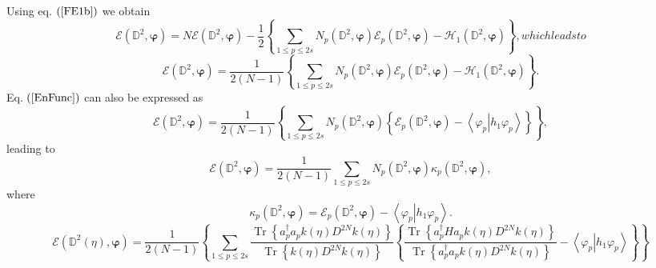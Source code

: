 \documentclass[aps,preprint]{revtex4}%
\begin{document}
Using eq. $\left(  \ref{FE1b}\right)  $ we obtain
\begin{subequations}
\begin{equation}
\mathcal{E}\left(  \mathbb{D}^{2},\mathbf{\varphi}\right)  =N\mathcal{E}%
\left(  \mathbb{D}^{2},\mathbf{\varphi}\right)  -\frac{1}{2}\left\{
\sum_{1\leq p\leq2s}N_{p}\left(  \mathbb{D}^{2},\mathbf{\varphi}\right)
\mathcal{E}_{p}\left(  \mathbb{D}^{2},\mathbf{\varphi}\right)  -\mathcal{H}%
_{1}\left(  \mathbb{D}^{2},\mathbf{\varphi}\right)  \right\}  ,
\end{equation}
which leads to
\end{subequations}
\begin{equation}
\mathcal{E}\left(  \mathbb{D}^{2},\mathbf{\varphi}\right)  =\frac{1}{2\left(
N-1\right)  }\left\{  \sum_{1\leq p\leq2s}N_{p}\left(  \mathbb{D}%
^{2},\mathbf{\varphi}\right)  \mathcal{E}_{p}\left(  \mathbb{D}^{2}%
,\mathbf{\varphi}\right)  -\mathcal{H}_{1}\left(  \mathbb{D}^{2}%
,\mathbf{\varphi}\right)  \right\}  . \label{EnFunc}%
\end{equation}
Eq. $\left(  \ref{EnFunc}\right)  $ can also be expressed as
\begin{equation}
\mathcal{E}\left(  \mathbb{D}^{2},\mathbf{\varphi}\right)  =\frac{1}{2\left(
N-1\right)  }\left\{  \sum_{1\leq p\leq2s}N_{p}\left(  \mathbb{D}%
^{2},\mathbf{\varphi}\right)  \left\{  \mathcal{E}_{p}\left(  \mathbb{D}%
^{2},\mathbf{\varphi}\right)  -\left\langle \left.  \varphi_{p}\right\vert
h_{1}\varphi_{p}\right\rangle \right\}  \right\}  ,
\end{equation}
leading to
\begin{equation}
\mathcal{E}\left(  \mathbb{D}^{2},\mathbf{\varphi}\right)  =\frac{1}{2\left(
N-1\right)  }\sum_{1\leq p\leq2s}N_{p}\left(  \mathbb{D}^{2},\mathbf{\varphi
}\right)  \kappa_{p}\left(  \mathbb{D}^{2},\mathbf{\varphi}\right)  ,
\end{equation}
where
\begin{equation}
\kappa_{p}\left(  \mathbb{D}^{2},\mathbf{\varphi}\right)  =\mathcal{E}%
_{p}\left(  \mathbb{D}^{2},\mathbf{\varphi}\right)  -\left\langle \left.
\varphi_{p}\right\vert h_{1}\varphi_{p}\right\rangle .
\end{equation}%
\begin{equation}
\mathcal{E}\left(  \mathbb{D}^{2}\left(  \eta\right)  ,\mathbf{\varphi
}\right)  =\frac{1}{2\left(  N-1\right)  }\left\{  \sum_{1\leq p\leq2s}%
\frac{\operatorname{Tr}\left\{  a_{p}^{\dagger}a_{p}k\left(  \eta\right)
D^{2N}k\left(  \eta\right)  \right\}  }{\operatorname{Tr}\left\{  k\left(
\eta\right)  D^{2N}k\left(  \eta\right)  \right\}  }\left\{  \frac
{\operatorname{Tr}\left\{  a_{p}^{\dagger}Ha_{p}k\left(  \eta\right)
D^{2N}k\left(  \eta\right)  \right\}  }{\operatorname{Tr}\left\{
a_{p}^{\dagger}a_{p}k\left(  \eta\right)  D^{2N}k\left(  \eta\right)
\right\}  }-\left\langle \left.  \varphi_{p}\right\vert h_{1}\varphi
_{p}\right\rangle \right\}  \right\}
\end{equation}%
\end{document}
